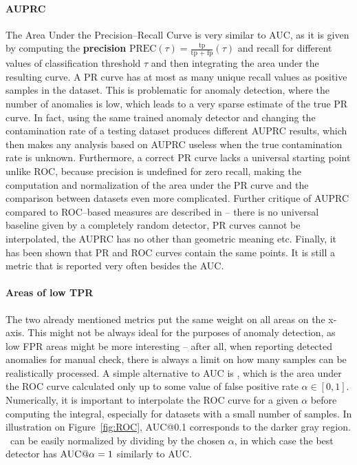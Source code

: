 \paragraph{AUPRC}
The Area Under the Precision--Recall Curve is very similar to AUC, as it is given by computing the \textbf{precision} $\text{PREC}(\tau)=\frac{\text{tp}}{\text{tp + fp}}(\tau)$ and recall for different values of classification threshold $\tau$ and then integrating the area under the resulting curve. A PR curve has at most as many unique recall values as positive samples in the dataset. This is problematic for anomaly detection, where the number of anomalies is low, which leads to a very sparse estimate of the true PR curve. In fact, using the same trained anomaly detector and changing the contamination rate of a testing dataset produces different AUPRC results, which then makes any analysis based on AUPRC useless when the true contamination rate is unknown. Furthermore, a correct PR curve lacks a universal starting point unlike ROC, because precision is undefined for zero recall, making the computation and normalization of the area under the PR curve and the comparison between datasets even more complicated. Further critique of AUPRC compared to ROC--based measures are described in \cite{flach2015precision} -- there is no universal baseline given by a completely random detector, PR curves cannot be interpolated, the AUPRC has no other than geometric meaning etc. Finally, it has been shown \cite{davis2006relationship} that PR and ROC curves contain the same points. It is still a metric that is reported very often besides the AUC.

\paragraph{Areas of low TPR}
The two already mentioned metrics put the same weight on all areas on the x-axis. This might not be always ideal for the purposes of anomaly detection, as low FPR areas might be more interesting -- after all, when reporting detected anomalies for manual check, there is always a limit on how many samples can be realistically processed. A simple alternative to AUC is \textbf{\auca}, which is the area under the ROC curve calculated only up to some value of false positive rate $\alpha \in [0,1]$. Numerically, it is important to interpolate the ROC curve for a given $\alpha$ before computing the integral, especially for datasets with a small number of samples. In illustration on Figure~\ref{fig:ROC}, AUC@0.1 corresponds to the darker gray region. \auca\ can be easily normalized by dividing by the chosen $\alpha$, in which case the best detector has $\textrm{AUC@}\alpha = 1$ similarly to AUC.

